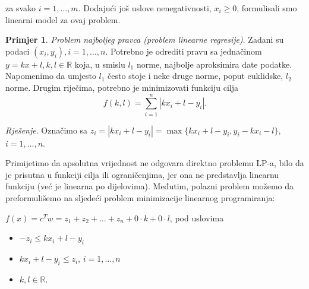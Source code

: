 \documentclass[b5paper, utf8, 11pt, colorlinks]{book}
\theoremstyle{definition}
\newtheorem{primjer}{Primjer}[chapter]
\begin{document}
 za svako $i=1,\ldots,m$. Dodajući još uslove nenegativnosti, $x_i \geq 0$, formulisali smo linearni model za ovaj problem.  
  \begin{primjer}
 \emph{Problem najboljeg pravca (problem linearne regresije)}. Zadani su podaci $(x_i, y_i), i = 1, \ldots , n$. Potrebno je odrediti pravu sa jednačinom $y = k x + l,
k, l \in \mathbb{R}$ koja, u smislu $l_1$ norme, najbolje aproksimira date podatke.  Napomenimo da umjesto $l_1$ često stoje i neke druge norme, poput euklidske, $l_2$ norme. Drugim riječima, potrebno je minimizovati  funkciju cilja $$f(k, l) = \sum_{i=1}^n |k x_i + l - y_i|.$$
 \end{primjer}

\emph{Rješenje}.
Označimo sa $z_i = |k x_i + l - y_i| = \max\{k x_i + l - y_i, y_i - k x_i - l \}$, $i=1,\ldots,n$. 


Primijetimo da apsolutna vrijednost ne odgovara direktno problemu LP-a, bilo da je prisutna u funkciji cilja ili ograničenjima, jer ona ne predstavlja linearnu funkciju (već je  linearna po dijelovima). Međutim, polazni problem možemo da preformulišemo na sljedeći  problem minimizacije linearnog programiranja: %

$f(x) = c^T w = z_1 + z_2 + \ldots + z_n + 0\cdot k + 0 \cdot l$, pod uslovima
\begin{itemize}
    \item $ -z_i \leq k x_i + l - y_i$ 
    \item $ k x_i + l - y_i \leq z_i $, $i=1, \ldots, n$
    \item $k,l \in \mathbb{R}$. 
\end{itemize}
\end{document}
